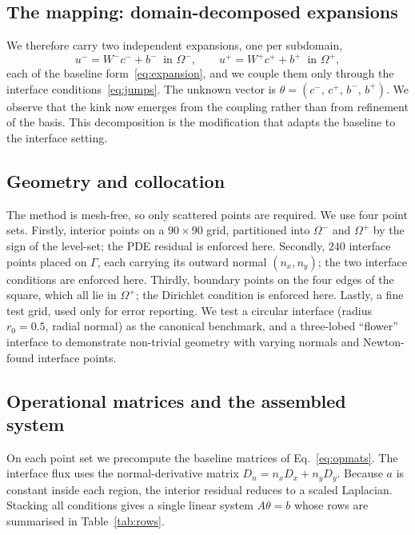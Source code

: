 \documentclass[pdflatex,sn-mathphys-num]{sn-jnl}%
\theoremstyle{thmstyleone}%
\theoremstyle{thmstyletwo}%
\theoremstyle{thmstylethree}%
\begin{document}
\subsection{The mapping: domain-decomposed expansions}\label{subsec:mapping}
We therefore carry two independent expansions, one per subdomain,
\begin{equation}
u^- = W^- c^- + b^- \ \text{ in } \Omega^-,
\qquad
u^+ = W^+ c^+ + b^+ \ \text{ in } \Omega^+,
\label{eq:two-exp}
\end{equation}
each of the baseline form~\eqref{eq:expansion}, and we couple them only through the interface conditions~\eqref{eq:jumps}. The unknown vector is $\theta=(c^-,\,c^+,\,b^-,\,b^+)$. We observe that the kink now emerges from the coupling rather than from refinement of the basis. This decomposition is the modification that adapts the baseline to the interface setting.

\subsection{Geometry and collocation}\label{subsec:collocation}
The method is mesh-free, so only scattered points are required. We use four point sets. Firstly, interior points on a $90\times90$ grid, partitioned into $\Omega^-$ and $\Omega^+$ by the sign of the level-set; the PDE residual is enforced here. Secondly, $240$ interface points placed on $\Gamma$, each carrying its outward normal $(n_x,n_y)$; the two interface conditions are enforced here. Thirdly, boundary points on the four edges of the square, which all lie in $\Omega^+$; the Dirichlet condition is enforced here. Lastly, a fine test grid, used only for error reporting. We test a circular interface (radius $r_0=0.5$, radial normal) as the canonical benchmark, and a three-lobed ``flower'' interface to demonstrate non-trivial geometry with varying normals and Newton-found interface points.

\subsection{Operational matrices and the assembled system}\label{subsec:assembly}
On each point set we precompute the baseline matrices of Eq.~\eqref{eq:opmats}. The interface flux uses the normal-derivative matrix $D_n = n_x D_x + n_y D_y$. Because $a$ is constant inside each region, the interior residual reduces to a scaled Laplacian. Stacking all conditions gives a single linear system $A\theta=b$ whose rows are summarised in Table~\ref{tab:rows}.
\end{document}
